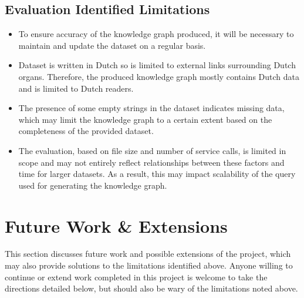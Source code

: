 \subsection{Evaluation Identified Limitations}
\begin{itemize}
    \item To ensure accuracy of the knowledge graph produced, it will be necessary to maintain and update the dataset on a regular basis.
    \item Dataset is written in Dutch so is limited to external links surrounding Dutch organs. Therefore, the produced knowledge graph mostly contains Dutch data and is limited to Dutch readers. 
    \item The presence of some empty strings in the dataset indicates missing data, which may limit the knowledge graph to a certain extent based on the completeness of the provided dataset.
    \item  The evaluation, based on file size and number of service calls, is limited in scope and may not entirely reflect relationships between these factors and time for larger datasets. As a result, this may impact scalability of the query used for generating the knowledge graph.
\end{itemize}

\section{Future Work \& Extensions}
\hspace{0.5cm} This section discusses future work and possible extensions of the project, which may also provide solutions to the limitations identified above. Anyone willing to continue or extend work completed in this project is welcome to take the directions detailed below, but should also be wary of the limitations noted above. 

